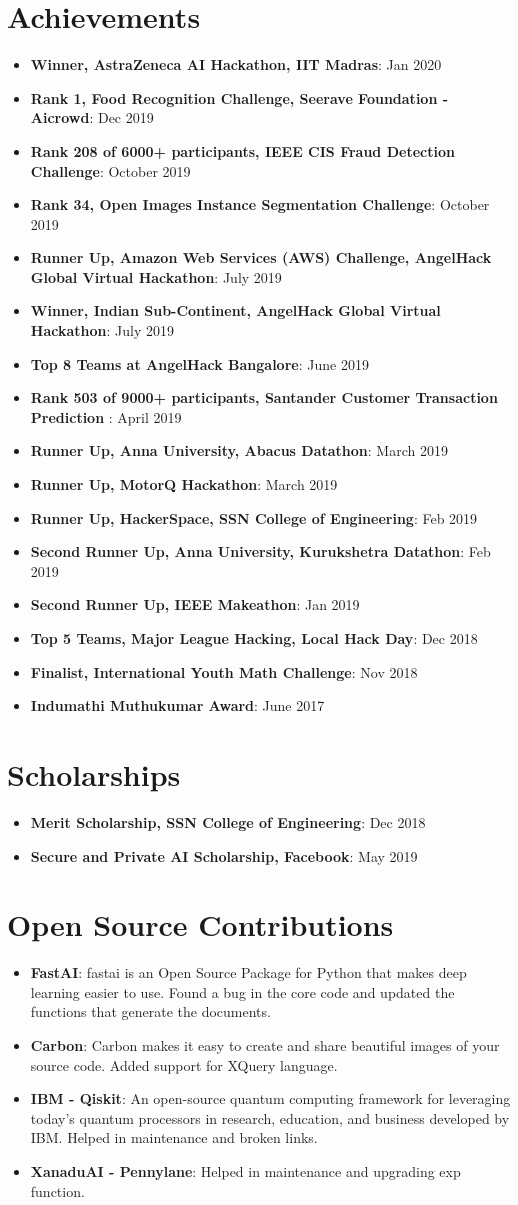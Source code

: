 \documentclass[letterpaper,11pt]{article}
\newcommand{\resumeItem}[2]{
  \item\small{
    \textbf{#1}{: #2 \vspace{-2pt}}
  }
}
\newcommand{\resumeSubItem}[2]{\resumeItem{#1}{#2}\vspace{-4pt}}
\newcommand{\resumeSubHeadingListStart}{\begin{itemize}[leftmargin=*]}
\newcommand{\resumeSubHeadingListEnd}{\end{itemize}}
\begin{document}
\section{Achievements}
  \resumeSubHeadingListStart
               \resumeSubItem
  {Winner, AstraZeneca AI Hackathon, IIT Madras}{Jan 2020}
             \resumeSubItem
  {Rank 1, Food Recognition Challenge, Seerave Foundation - Aicrowd}{Dec 2019}
           \resumeSubItem
  {Rank 208 of 6000+ participants, IEEE CIS Fraud Detection Challenge}{October 2019}
         \resumeSubItem
  {Rank 34, Open Images Instance Segmentation Challenge}{October 2019}
       \resumeSubItem
  {Runner Up, Amazon Web Services (AWS) Challenge, AngelHack Global Virtual Hackathon}{July 2019}
     \resumeSubItem
  {Winner, Indian Sub-Continent, AngelHack Global Virtual Hackathon}{July 2019}
    \resumeSubItem
  {Top 8 Teams at AngelHack Bangalore}{June 2019}
  \resumeSubItem
  {Rank 503 of 9000+ participants, Santander Customer Transaction Prediction }{April 2019}
    \resumeSubItem
  {Runner Up, Anna University, Abacus Datathon}{March 2019}
    \resumeSubItem
  {Runner Up, MotorQ Hackathon}{March 2019}
     \resumeSubItem
  {Runner Up, HackerSpace, SSN College of Engineering}{Feb 2019}
    \resumeSubItem
  {Second Runner Up, Anna University, Kurukshetra Datathon}{Feb 2019}
  \resumeSubItem
  {Second Runner Up, IEEE Makeathon}{Jan 2019} 	
     \resumeSubItem
      {Top 5 Teams, Major League Hacking, Local Hack Day}{Dec 2018}
  \resumeSubItem
    {Finalist, International Youth Math Challenge}{Nov 2018}
    \resumeSubItem
      {Indumathi Muthukumar Award}{June 2017}
  \resumeSubHeadingListEnd
\section{Scholarships}
  \resumeSubHeadingListStart
      \resumeSubItem
  {Merit Scholarship, SSN College of Engineering}{Dec 2018}
    \resumeSubItem
      {Secure and Private AI Scholarship, Facebook}{May 2019}	
\resumeSubHeadingListEnd
\section{Open Source Contributions}
  \resumeSubHeadingListStart
      \resumeSubItem
  {FastAI}{fastai is an Open Source Package for Python that makes deep learning easier to use. Found a bug in the core code and updated the functions that generate the documents.}
    \resumeSubItem
      {Carbon}{Carbon makes it easy to create and share beautiful images of your source code. Added support for XQuery language.}
  \resumeSubItem
  {IBM - Qiskit}{An open-source quantum computing framework for leveraging today's quantum processors in research, education, and business developed by IBM. Helped in maintenance and broken links.}
    \resumeSubItem
  {XanaduAI - Pennylane}{Helped in maintenance and upgrading exp function.}
\resumeSubHeadingListEnd
\end{document}
